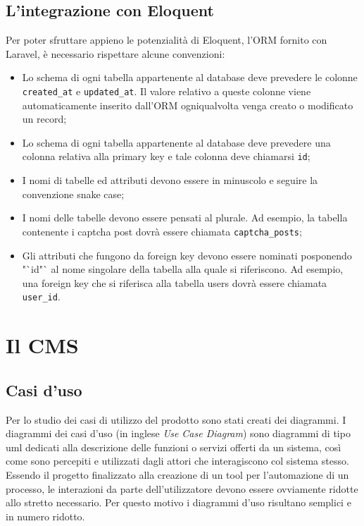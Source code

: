 \subsection{L'integrazione con Eloquent}
Per poter sfruttare appieno le potenzialità di Eloquent, l'ORM fornito con Laravel, è necessario rispettare alcune convenzioni:
\begin{itemize}
	\item Lo schema di ogni tabella appartenente al database deve prevedere le colonne \verb!created_at! e \verb!updated_at!. Il valore relativo a queste colonne viene automaticamente inserito dall'ORM ogniqualvolta venga creato o modificato un record;
	\item Lo schema di ogni tabella appartenente al database deve prevedere una colonna relativa alla primary key e tale colonna deve chiamarsi \verb!id!;
	\item I nomi di tabelle ed attributi devono essere in minuscolo e seguire la convenzione snake case;
	\item I nomi delle tabelle devono essere pensati al plurale. Ad esempio, la tabella contenente i captcha post dovrà essere chiamata \verb!captcha_posts!;
		\item Gli attributi che fungono da foreign key devono essere nominati posponendo "`id"` al nome singolare della tabella alla quale si riferiscono. Ad esempio, una foreign key che si riferisca alla tabella users dovrà essere chiamata \verb!user_id!.
\end{itemize}

\section{Il CMS}

\subsection{Casi d'uso}

Per lo studio dei casi di utilizzo del prodotto sono stati creati dei diagrammi.
I diagrammi dei casi d'uso (in inglese \emph{Use Case Diagram}) sono diagrammi di tipo \gls{uml} dedicati alla descrizione delle funzioni o servizi offerti da un sistema, così come sono percepiti e utilizzati dagli attori che interagiscono col sistema stesso.
Essendo il progetto finalizzato alla creazione di un tool per l'automazione di un processo, le interazioni da parte dell'utilizzatore devono essere ovviamente ridotte allo stretto necessario. Per questo motivo i diagrammi d'uso risultano semplici e in numero ridotto.

